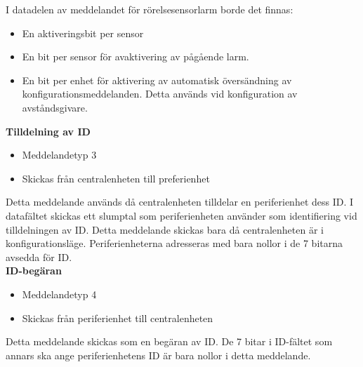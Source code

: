 I datadelen av meddelandet för rörelsesensorlarm borde det finnas:
\begin{itemize}
	\item En aktiveringsbit per sensor
	\item En bit per sensor för avaktivering av pågående larm.
	\item En bit per enhet för aktivering av automatisk översändning av konfigurationsmeddelanden. Detta används vid konfiguration av avståndsgivare.
\end{itemize}


\textbf{Tilldelning av ID}
\begin{itemize}
    \item Meddelandetyp 3
    \item Skickas från centralenheten till preferienhet
\end{itemize}
Detta meddelande används då centralenheten tilldelar en periferienhet dess ID. I datafältet skickas ett slumptal som periferienheten använder som identifiering vid tilldelningen av ID. Detta meddelande skickas bara då centralenheten är i konfigurationsläge. Periferienheterna adresseras med bara nollor i de 7 bitarna avsedda för ID. \\


\textbf{ID-begäran}
\begin{itemize}
    \item Meddelandetyp 4
    \item Skickas från periferienhet till centralenheten
\end{itemize}
Detta meddelande skickas som en begäran av ID. De 7 bitar i ID-fältet som annars ska ange periferienhetens ID är bara nollor i detta meddelande.
